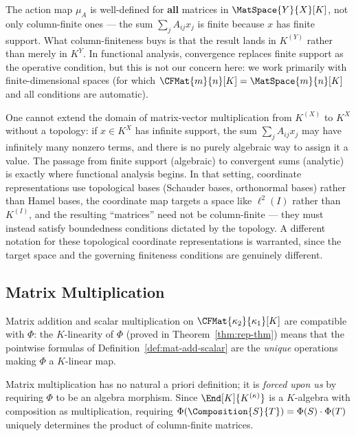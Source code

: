 \begin{remark}[Scope]
    The action map $\mu_A$ is well-defined for \textbf{all} matrices in $\MatSpace{Y}{X}[K]$,
    not only column-finite ones --- the sum $\sum_j A_{ij} x_j$ is finite because $x$ has
    finite support. What column-finiteness buys is that the result lands in $K^{(Y)}$ rather
    than merely in $K^Y$. In functional analysis, convergence replaces finite support as the
    operative condition, but this is not our concern here: we work primarily with
    finite-dimensional spaces (for which $\CFMat{m}{n}[K] = \MatSpace{m}{n}[K]$ and all
    conditions are automatic).

    One cannot extend the domain of matrix-vector multiplication from $K^{(X)}$ to $K^X$
    without a topology: if $x \in K^X$ has infinite support, the sum $\sum_j A_{ij} x_j$ may
    have infinitely many nonzero terms, and there is no purely algebraic way to assign it a
    value. The passage from finite support (algebraic) to convergent sums (analytic) is exactly
    where functional analysis begins. In that setting, coordinate representations use
    topological bases (Schauder bases, orthonormal bases) rather than Hamel bases, the
    coordinate map targets a space like $\ell^2(I)$ rather than $K^{(I)}$, and the resulting
    ``matrices'' need not be column-finite --- they must instead satisfy boundedness conditions
    dictated by the topology. A different notation for these topological coordinate
    representations is warranted, since the target space and the governing finiteness conditions
    are genuinely different.
\end{remark}


\newpage
\subsection{Matrix Multiplication}

\begin{remark}
    Matrix addition and scalar multiplication on $\CFMat{\kappa_2}{\kappa_1}[K]$ are
    compatible with $\Phi$: the $K$-linearity of $\Phi$ (proved in
    Theorem~\ref{thm:rep-thm}) means that the pointwise formulas of
    Definition~\ref{def:mat-add-scalar} are the \emph{unique} operations making $\Phi$ a
    $K$-linear map.

    Matrix multiplication has no natural a priori definition; it is \emph{forced upon us} by
    requiring $\Phi$ to be an algebra morphism. Since $\End[K]{K^{(\kappa)}}$ is a $K$-algebra
    with composition as multiplication, requiring
    $\Phi(\Composition{S}{T}) = \Phi(S) \cdot \Phi(T)$ uniquely determines the product of
    column-finite matrices.
\end{remark}

